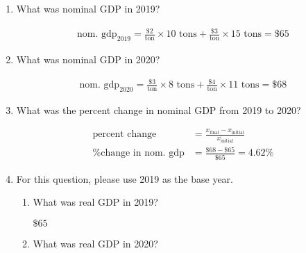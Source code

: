 \documentclass{assignment}
\begin{document}
\begin{enumerate}

\item What was nominal GDP in 2019?

\begin{solution}
\vspace{-1.0\baselineskip}
\begin{align*}
\text{nom. gdp}_\text{2019} = \frac{\$2}{\text{ton}} \times 10 \text{ tons} + \frac{\$3}{\text{ton}} \times 15 \text{ tons} = \$65
\end{align*}
\end{solution}

\item What was nominal GDP in 2020?

\begin{solution}
\vspace{-1.0\baselineskip}
\begin{align*}
\text{nom. gdp}_\text{2020} = \frac{\$3}{\text{ton}} \times 8 \text{ tons} + \frac{\$4}{\text{ton}} \times 11 \text{ tons} = \$68
\end{align*}
\end{solution}

\item What was the percent change in nominal GDP from 2019 to 2020?

\begin{solution}
\vspace{-1.0\baselineskip}
\begin{align*}
\text{percent change} &= \frac{ x_\text{final} - x_\text{initial} }{ x_\text{initial} } \\
\text{\% change in nom. gdp} &= \frac{\$68 - \$65}{\$65} = 4.62\%
\end{align*}
\end{solution}

\item For this question, please use 2019 as the base year.

\begin{enumerate}

\vspace{-6pt}
\item What was real GDP in 2019?

\begin{solution}
$\$65$
\end{solution}

\vspace{-6pt}
\item What was real GDP in 2020?


\end{enumerate}
\end{enumerate}
\end{document}
